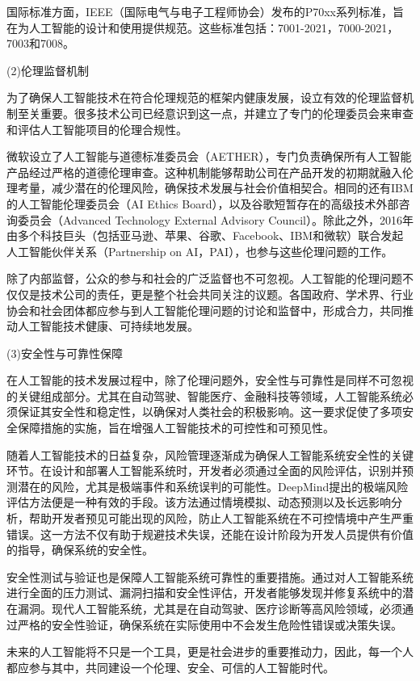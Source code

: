 国际标准方面，IEEE（国际电气与电子工程师协会）发布的P70xx系列标准，旨在为人工智能的设计和使用提供规范。这些标准包括：7001-2021，7000-2021，7003和7008。

(2)伦理监督机制

为了确保人工智能技术在符合伦理规范的框架内健康发展，设立有效的伦理监督机制至关重要。很多技术公司已经意识到这一点，并建立了专门的伦理委员会来审查和评估人工智能项目的伦理合规性。

微软设立了人工智能与道德标准委员会（AETHER），专门负责确保所有人工智能产品经过严格的道德伦理审查。这种机制能够帮助公司在产品开发的初期就融入伦理考量，减少潜在的伦理风险，确保技术发展与社会价值相契合。相同的还有IBM的人工智能伦理委员会（AI Ethics Board），以及谷歌短暂存在的高级技术外部咨询委员会（Advanced Technology External Advisory Council）。除此之外，2016年由多个科技巨头（包括亚马逊、苹果、谷歌、Facebook、IBM和微软）联合发起人工智能伙伴关系（Partnership on AI，PAI），也参与这些伦理问题的工作。

除了内部监督，公众的参与和社会的广泛监督也不可忽视。人工智能的伦理问题不仅仅是技术公司的责任，更是整个社会共同关注的议题。各国政府、学术界、行业协会和社会团体都应参与到人工智能伦理问题的讨论和监督中，形成合力，共同推动人工智能技术健康、可持续地发展。

(3)安全性与可靠性保障

在人工智能的技术发展过程中，除了伦理问题外，安全性与可靠性是同样不可忽视的关键组成部分。尤其在自动驾驶、智能医疗、金融科技等领域，人工智能系统必须保证其安全性和稳定性，以确保对人类社会的积极影响。这一要求促使了多项安全保障措施的实施，旨在增强人工智能技术的可控性和可预见性。

随着人工智能技术的日益复杂，风险管理逐渐成为确保人工智能系统安全性的关键环节。在设计和部署人工智能系统时，开发者必须通过全面的风险评估，识别并预测潜在的风险，尤其是极端事件和系统误判的可能性。DeepMind提出的极端风险评估方法便是一种有效的手段。该方法通过情境模拟、动态预测以及长远影响分析，帮助开发者预见可能出现的风险，防止人工智能系统在不可控情境中产生严重错误。这一方法不仅有助于规避技术失误，还能在设计阶段为开发人员提供有价值的指导，确保系统的安全性。

安全性测试与验证也是保障人工智能系统可靠性的重要措施。通过对人工智能系统进行全面的压力测试、漏洞扫描和安全性评估，开发者能够发现并修复系统中的潜在漏洞。现代人工智能系统，尤其是在自动驾驶、医疗诊断等高风险领域，必须通过严格的安全性验证，确保系统在实际使用中不会发生危险性错误或决策失误。


未来的人工智能将不只是一个工具，更是社会进步的重要推动力，因此，每一个人都应参与其中，共同建设一个伦理、安全、可信的人工智能时代。


